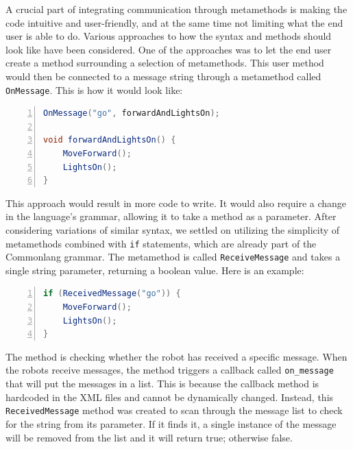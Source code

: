 \documentclass[runningheads]{llncs}
\begin{document}
A crucial part of integrating communication through metamethods is making the code intuitive and user-friendly, and at the same time not limiting what the end user is able to do. 
Various approaches to how the syntax and methods should look like have been considered. 
One of the approaches was to let the end user create a  method surrounding a selection of metamethods. 
This user method would then be connected to a message string through a metamethod called \texttt{OnMessage}. 
This is how it would look like:


\begin{lstlisting}[breaklines,style=AMMA,language=java,mathescape,rulesepcolor=\color{black},caption=\small{OnMessage metamethod} ,captionpos=t,label={lst:T},numbers=left]
OnMessage("go", forwardAndLightsOn);

void forwardAndLightsOn() {
	MoveForward();
	LightsOn();	
}
\end{lstlisting}




This approach would result in more code to write. 
It would also require a change in the language’s grammar, allowing it to take a method as a parameter. 
After considering variations of similar syntax, we settled on utilizing the simplicity of metamethods combined with \texttt{if} statements, which are already part of the Commonlang grammar.
The metamethod is called \texttt{ReceiveMessage} and takes a single string parameter, returning a boolean value. Here is an example:


\begin{lstlisting}[breaklines,style=AMMA,language=java,mathescape,rulesepcolor=\color{black},caption=\small{ReceiveMessage metamethod} ,captionpos=t,label={lst:T2},numbers=left]
if (ReceivedMessage("go")) {
	MoveForward();
	LightsOn();
}
\end{lstlisting}


The method is checking whether the robot has received a specific message. 
When the robots receive messages, the method triggers a callback called \texttt{on\_message} that will put the messages in a list. 
This is because the callback method is hardcoded in the XML files and cannot be dynamically changed. 
Instead, this \texttt{ReceivedMessage} method was created to scan through the message list to check for the string from its parameter. 
If it finds it, a single instance of the message will be removed from the list and it will return true; otherwise false.
\end{document}
